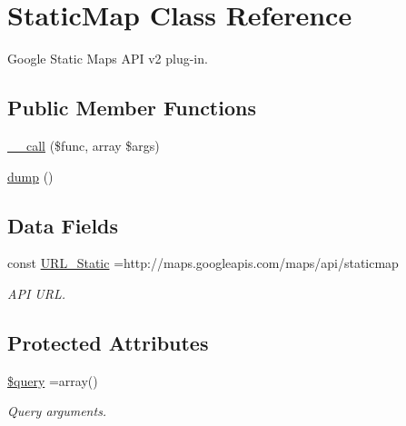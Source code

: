 \hypertarget{class_web_1_1_google_1_1_static_map}{}\section{Static\+Map Class Reference}
\label{class_web_1_1_google_1_1_static_map}


Google Static Maps A\+PI v2 plug-\/in.  


\subsection*{Public Member Functions}
\begin{DoxyCompactItemize}
\item 
\hyperlink{class_web_1_1_google_1_1_static_map_a975d2c46a134129eb727fadcadf48adf}{\+\_\+\+\_\+call} (\$func, array \$args)
\item 
\hyperlink{class_web_1_1_google_1_1_static_map_a5bf63e4ac70cfd9d97e3f2eab936ec8b}{dump} ()
\end{DoxyCompactItemize}
\subsection*{Data Fields}
\begin{DoxyCompactItemize}
\item 
\hypertarget{class_web_1_1_google_1_1_static_map_a132a64893723969cf7aef4818415a546}{}\label{class_web_1_1_google_1_1_static_map_a132a64893723969cf7aef4818415a546} 
const \hyperlink{class_web_1_1_google_1_1_static_map_a132a64893723969cf7aef4818415a546}{U\+R\+L\+\_\+\+Static} =\textquotesingle{}http\+://maps.\+googleapis.\+com/maps/api/staticmap\textquotesingle{}
\begin{DoxyCompactList}\small\item\em A\+PI U\+RL. \end{DoxyCompactList}\end{DoxyCompactItemize}
\subsection*{Protected Attributes}
\begin{DoxyCompactItemize}
\item 
\hypertarget{class_web_1_1_google_1_1_static_map_af59a5f7cd609e592c41dc3643efd3c98}{}\label{class_web_1_1_google_1_1_static_map_af59a5f7cd609e592c41dc3643efd3c98} 
\hyperlink{class_web_1_1_google_1_1_static_map_af59a5f7cd609e592c41dc3643efd3c98}{\$query} =array()
\begin{DoxyCompactList}\small\item\em Query arguments. \end{DoxyCompactList}\end{DoxyCompactItemize}


